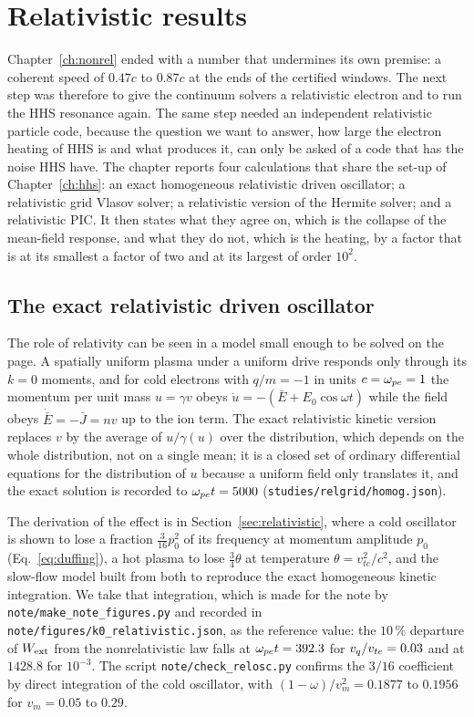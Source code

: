 \chapter{Relativistic results}\label{ch:rel}

Chapter~\ref{ch:nonrel} ended with a number that undermines its own premise: a coherent speed of $0.47c$ to $0.87c$ at the ends of the certified windows. The next step was therefore to give the continuum solvers a relativistic electron and to run the HHS resonance again. The same step needed an independent relativistic particle code, because the question we want to answer, how large the electron heating of HHS is and what produces it, can only be asked of a code that has the noise HHS have. The chapter reports four calculations that share the set-up of Chapter~\ref{ch:hhs}: an exact homogeneous relativistic driven oscillator; a relativistic grid Vlasov solver; a relativistic version of the Hermite solver; and a relativistic PIC. It then states what they agree on, which is the collapse of the mean-field response, and what they do not, which is the heating, by a factor that is at its smallest a factor of two and at its largest of order $10^{2}$.

\section{The exact relativistic driven oscillator}\label{sec:c10-homog}

The role of relativity can be seen in a model small enough to be solved on the page. A spatially uniform plasma under a uniform drive responds only through its $k=0$ moments, and for cold electrons with $q/m=-1$ in units $c=\omega_{pe}=1$ the momentum per unit mass $u=\gamma v$ obeys $\dot u=-(\bar E+E_0\cos\omega t)$ while the field obeys $\dot{\bar E}=-\bar J=nv$ up to the ion term. The exact relativistic kinetic version replaces $v$ by the average of $u/\gamma(u)$ over the distribution, which depends on the whole distribution, not on a single mean; it is a closed set of ordinary differential equations for the distribution of $u$ because a uniform field only translates it, and the exact solution is recorded to $\omega_{pe} t=5000$ (\texttt{studies/relgrid/homog.json}).

The derivation of the effect is in Section~\ref{sec:relativistic}, where a cold oscillator is shown to lose a fraction $\tfrac3{16}p_0^2$ of its frequency at momentum amplitude $p_0$ (Eq.~\eqref{eq:duffing}), a hot plasma to lose $\tfrac34\theta$ at temperature $\theta=v_{te}^2/c^2$, and the slow-flow model built from both to reproduce the exact homogeneous kinetic integration. We take that integration, which is made for the note by \texttt{note/make\_note\_figures.py} and recorded in \texttt{note/figures/k0\_relativistic.json}, as the reference value: the $10\,\%$ departure of $W_{\rm ext}$ from the nonrelativistic law falls at $\omega_{pe} t=392.3$ for $v_q/v_{te}=0.03$ and at $1428.8$ for $10^{-3}$. The script \texttt{note/check\_relosc.py} confirms the $3/16$ coefficient by direct integration of the cold oscillator, with $(1-\omega)/v_m^2=0.1877$ to $0.1956$ for $v_m=0.05$ to $0.29$.

